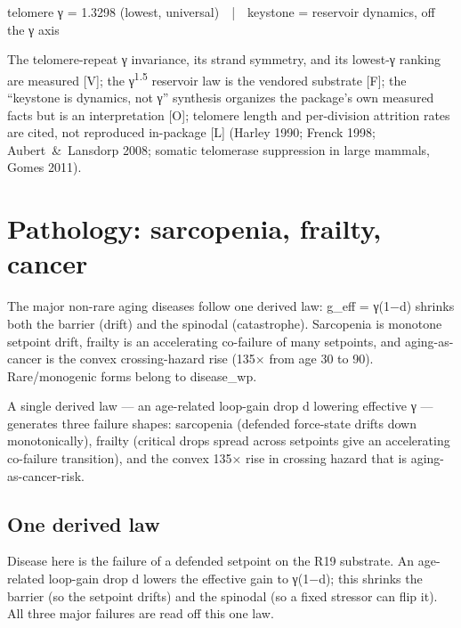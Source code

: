 \documentclass[11pt]{article}
\begin{document}
\begin{center}\ttfamily\small telomere γ = 1.3298 (lowest, universal)  |  keystone = reservoir dynamics, off the γ axis\end{center}

The telomere-repeat γ invariance, its strand symmetry, and its lowest-γ ranking are measured [V]; the γ\textsuperscript{1.5} reservoir law is the vendored substrate [F]; the “keystone is dynamics, not γ” synthesis organizes the package's own measured facts but is an interpretation [O]; telomere length and per-division attrition rates are cited, not reproduced in-package [L] (Harley 1990; Frenck 1998; Aubert \& Lansdorp 2008; somatic telomerase suppression in large mammals, Gomes 2011).

\section{Pathology: sarcopenia, frailty, cancer}

\begin{answerbox}The major non-rare aging diseases follow one derived law: g\_eff = γ(1−d) shrinks both the barrier (drift) and the spinodal (catastrophe). Sarcopenia is monotone setpoint drift, frailty is an accelerating co-failure of many setpoints, and aging-as-cancer is the convex crossing-hazard rise (135× from age 30 to 90). Rare/monogenic forms belong to disease\_wp.\end{answerbox}

\begin{abstractbox}A single derived law — an age-related loop-gain drop d lowering effective γ — generates three failure shapes: sarcopenia (defended force-state drifts down monotonically), frailty (critical drops spread across setpoints give an accelerating co-failure transition), and the convex 135× rise in crossing hazard that is aging-as-cancer-risk.\end{abstractbox}

\subsection*{One derived law}

Disease here is the failure of a defended setpoint on the R19 substrate. An age-related loop-gain drop d lowers the effective gain to γ(1−d); this shrinks the barrier (so the setpoint drifts) and the spinodal (so a fixed stressor can flip it). All three major failures are read off this one law.
\end{document}
